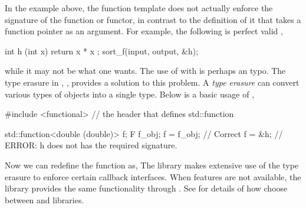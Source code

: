 In the example above, the function template  does not
actually enforce the signature of the function or functor, in contrast to the
definition of it that takes a function pointer as an argument. For example,
the following is perfect valid \cpp,
\begin{cppcode}
int h (int x) { return x * x };
sort_f(input, output, &h);
\end{cppcode}
while it may not be what one wants. The use of  with
 is perhaps an typo. The type erasure in \cppoo{},
, provides a solution to this problem. A \emph{type
  erasure} can convert various types of objects into a single type. Below is a
basic usage of ,
\begin{cppcode}
#include <functional> // the header that defines std::function

std::function<double (double)> f;
F f_obj;
f = f_obj;  // Correct
f = &h;     // ERROR: h does not has the required signature.
\end{cppcode}
Now we can redefine the function  as,
The \vsmc library makes extensive use of the type erasure to enforce certain
callback interfaces. When \cppoo features are not available, the \boost
library provides the same functionality through .
See \cite{vsmcjss} for details of how \vsmc choose between \cppoo and \boost
libraries.
